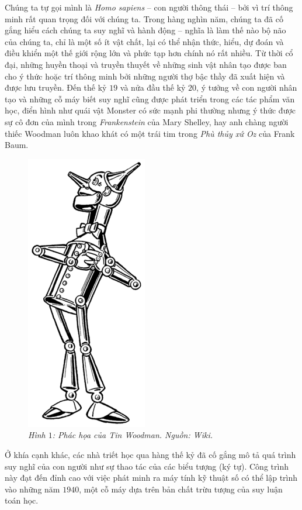 \begin{multicols}{2}
	Chúng ta tự gọi mình là \textit{Homo sapiens} -- con người thông thái -- bởi vì trí thông minh rất quan trọng đối với chúng ta. Trong hàng nghìn năm, chúng ta đã cố gắng hiểu cách chúng ta suy nghĩ và hành động -- nghĩa là làm thế nào bộ não của chúng ta, chỉ là một số ít vật chất, lại có thể nhận thức, hiểu, dự đoán và điều khiển một thế giới rộng lớn và phức tạp hơn chính nó rất nhiều. Từ thời cổ đại, những huyền thoại và truyền thuyết về những sinh vật nhân tạo được ban cho ý thức hoặc trí thông minh bởi những người thợ bậc thầy đã xuất hiện và được lưu truyền. Đến thế kỷ $19$ và nửa đầu thế kỷ $20$, ý tưởng về con người nhân tạo và những cỗ máy biết suy nghĩ cũng được phát triển trong các tác phẩm văn học, điển hình như quái vật Monster có sức mạnh phi thường nhưng ý thức được sự cô đơn của mình trong \textit{Frankenstein} của Mary Shelley, hay anh chàng người thiếc Woodman luôn khao khát có một trái tim trong \textit{Phù thủy xứ Oz} của Frank Baum.
	\begin{figure}[H]
		\vspace*{-5pt}
		\centering
		\captionsetup{labelformat= empty, justification=centering}
		\includegraphics[width= 0.4\linewidth]{Tin_Woodman.png}
		\caption{\small\textit{\color{timhieukhoahoc}Hình $1$: Phác họa của Tin Woodman. Nguồn: Wiki.}}
		\vspace*{-10pt}
	\end{figure}
	Ở khía cạnh khác, các nhà triết học qua hàng thế kỷ đã cố gắng mô tả quá trình suy nghĩ của con người như sự thao tác của các biểu tượng (ký tự). Công trình này đạt đến đỉnh cao với việc phát minh ra máy tính kỹ thuật số có thể lập trình vào những năm $1940$, một cỗ máy dựa trên bản chất trừu tượng của suy luận toán học. 

\end{multicols}
